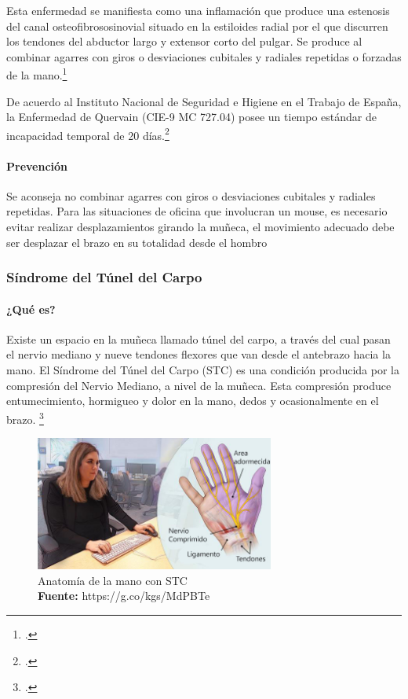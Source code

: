Esta enfermedad se manifiesta como una inflamación que produce una estenosis del canal osteofibrososinovial situado en la estiloides radial por el que discurren los tendones del abductor largo y extensor corto del pulgar. Se produce al combinar agarres con giros o desviaciones cubitales y radiales repetidas o forzadas de la mano.\footcite[2]{TenosinovitisDelPulgarDDCENFERMEDADESTME}

De acuerdo al Instituto Nacional de Seguridad e Higiene en el Trabajo de España, la Enfermedad de Quervain (CIE-9 MC 727.04) posee un tiempo estándar de incapacidad temporal de 20 días.\footcite[6]{TenosinovitisDelPulgarDDCENFERMEDADESTME}
\paragraph{Prevención}
Se aconseja no combinar agarres con giros o desviaciones cubitales y radiales repetidas. Para las situaciones de oficina que involucran un mouse, es necesario evitar realizar desplazamientos girando la muñeca, el movimiento adecuado debe ser desplazar el brazo en su totalidad desde el hombro
\subsubsection{Síndrome del Túnel del Carpo}
\paragraph{¿Qué es?}
Existe un espacio en la muñeca llamado túnel del carpo, a través del cual pasan el nervio mediano y nueve tendones flexores que van desde el antebrazo hacia la mano. El Síndrome del Túnel del Carpo (STC) es una condición producida por la compresión del Nervio Mediano, a nivel de la muñeca. Esta compresión produce entumecimiento, hormigueo y dolor en la mano, dedos y ocasionalmente en el brazo. \footcite{SindromeCarpiano}

\begin{figure}[H]
    \centering
    \includegraphics[width=0.7\textwidth]{Anexos/LATEX/chapters/images/STC.jpg}
    \caption{Anatomía de la mano con STC \\\textbf{Fuente:} https://g.co/kgs/MdPBTe}
    \label{STC}
\end{figure}

